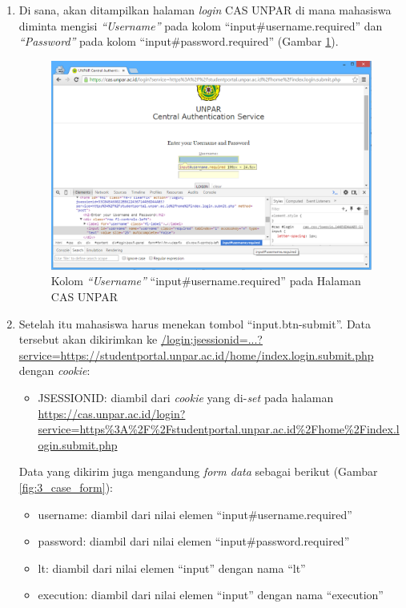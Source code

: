 \documentclass[a4paper,twoside]{article}
\begin{document}
\begin{enumerate}
\begin{enumerate}
\begin{enumerate}
	\item Di sana, akan ditampilkan halaman \textit{login} CAS UNPAR di mana mahasiswa diminta mengisi \textit{``Username''} pada kolom ``input\#username.required'' dan \textit{``Password''} pada kolom ``input\#password.required'' (Gambar \ref{fig:3_case_login_cas}).
	\begin{figure}[H]
			\centering
			\includegraphics[scale=0.5]{Gambar/case-login-cas}
			\caption{Kolom \textit{``Username''} ``input\#username.required'' pada Halaman CAS UNPAR} 
			\label{fig:3_case_login_cas}
		\end{figure}
	\item Setelah itu mahasiswa harus menekan tombol ``input.btn-submit''. Data tersebut akan dikirimkan ke \url{/login;jsessionid=...?service=https://studentportal.unpar.ac.id/home/index.login.submit.php} dengan \textit{cookie}:
	\begin{itemize}
		\item JSESSIONID: diambil dari \textit{cookie} yang di-\textit{set} pada halaman \url{https://cas.unpar.ac.id/login? service=https\%3A\%2F\%2Fstudentportal.unpar.ac.id\%2Fhome\%2Findex.login.submit.php}
	\end{itemize}
	 Data yang dikirim juga mengandung \textit{form data} sebagai berikut (Gambar \ref{fig:3_case_form}):
	\begin{itemize}
		\item username: diambil dari nilai elemen ``input\#username.required''
		\item password: diambil dari nilai elemen ``input\#password.required''
		\item lt: diambil dari nilai elemen ``input'' dengan nama ``lt''
		\item execution: diambil dari nilai elemen ``input'' dengan nama ``execution''

\end{itemize}
\end{enumerate}
\end{enumerate}
\end{enumerate}
\end{document}
